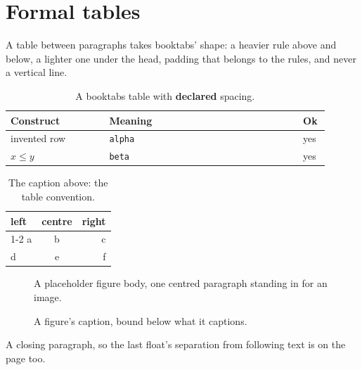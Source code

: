 \documentclass{article}
\begin{document}
\section{Formal tables}

A table between paragraphs takes booktabs' shape: a heavier rule above and
below, a lighter one under the head, padding that belongs to the rules, and
never a vertical line.

\begin{table}
\centering
\begin{tabular}{@{}p{0.29\linewidth}p{0.55\linewidth}p{0.06\linewidth}@{}}
  \toprule
  \textbf{Construct} & \textbf{Meaning} & \textbf{Ok} \\
  \midrule
  invented row & \texttt{alpha} & yes \\
  $x \leq y$ & \texttt{beta} & yes \\
  \bottomrule
\end{tabular}
\caption{A booktabs table with \textbf{declared} spacing.}
\end{table}

\begin{table}
\caption{The caption above: the table convention.}
\centering
\begin{tabular}{lcr}
  \toprule
  left & centre & right \\
  \cmidrule(lr){1-2}
  a & b & c \\
  \addlinespace
  d & e & f \\
  \bottomrule
\end{tabular}
\end{table}

\begin{figure}
\centering
A placeholder figure body, one centred paragraph standing in for an image.
\caption{A figure's caption, bound below what it captions.}
\end{figure}

A closing paragraph, so the last float's separation from following text is
on the page too.
\end{document}
